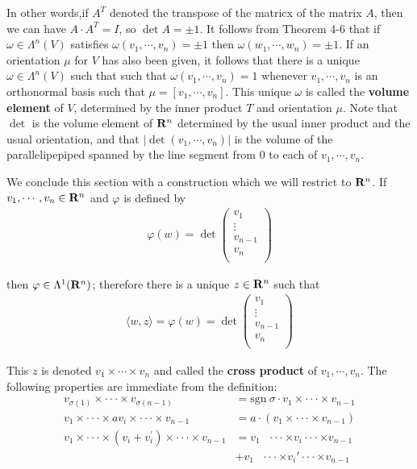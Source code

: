 In other words,if $A^T$ denoted the transpose of the matricx of the matrix $A$, then 
we can have $A\cdot A^T = I$, so $\det A=\pm 1$. It follows from Theorem 4-6 that if 
$\omega\in \Lambda^n(V)$ satisfies $\omega(v_1, \cdots, v_n) = \pm 1$ then 
$\omega(w_1, \cdots, w_n)=\pm 1$. If an orientation $\mu$ for $V$ has also been
given, it follows that there is a unique $\omega\in \Lambda^n(V)$ such that such that 
$\omega(v_1, \cdots, v_n) = 1$ whenever $v_1, \cdots, v_n$ is an orthonormal basis 
such that $\mu=[v_1,\cdots,v_n]$. This unique $\omega$ is called the \textbf{volume element}
of $V$, determined by the inner product $T$ and orientation $\mu$. Note that $\det$ is 
the volume element of $\mathbf{R}^n$ determined by the usual inner product and the usual orientation,
and that $|\det (v_1,\cdots,v_n)|$ is the volume of the parallelipepiped spanned by the line 
segment from 0 to each of $v_1,\cdots,v_n$.

We conclude this section with a construction which we will
restrict to $\mathbf{R}^n$. If $v_1, \cdots, v_n\in \mathbf{R}^n$ 
and $\varphi$ is defined by 
\begin{align*}
    \varphi(w) = \det \left(\begin{matrix}
        v_1 \\
        \vdots \\
        v_{n-1} \\
        v_n \\
    \end{matrix}\right)
\end{align*}

then $\varphi\in\Lambda^1(\mathbf{R}^n)$; therefore there is a unique $z\in\mathbf{R}^n$ such that 
\begin{align*}
    \langle w, z\rangle = \varphi(w) 
    = \det \left(\begin{matrix}
        v_1 \\
        \vdots \\
        v_{n-1} \\
        v_n \\
    \end{matrix}\right)
\end{align*}

This $z$ is denoted $v_1\times\cdots\times v_n$ and called the \textbf{cross product} of 
$v_1, \cdots, v_n$. The following properties are immediate from the definition:
\begin{align*}
    v_{\sigma(1)}\times\cdot\cdot\cdot\times v_{\sigma(n-1)} 
        & = \mathrm{sgn~}\sigma\cdot v_1\times\cdot\cdot\cdot\times v_{n-1} \\
    v_1\times\cdot\cdot\cdot\times av_i\times\cdot\cdot\cdot\times v_{n-1}
        & = a\cdot(v_1\times\cdot\cdot\cdot\times v_{n-1}) \\
    v_1\times\cdot\cdot\cdot\times(v_i+v_i^\prime)\times\cdot\cdot\cdot\times v_{n-1}
        & = v_1\text{  }\cdot\cdot\cdot\times v_i \cdot\cdot\cdot\times v_{n-1} \\
        & + v_1\text{  }\cdot\cdot\cdot\times v_i' \cdot\cdot\cdot\times v_{n-1}
\end{align*}

